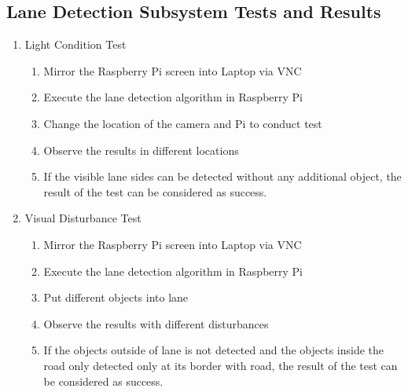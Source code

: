 \documentclass[a4paper,12pt]{article}
\begin{document}
\subsection {Lane Detection Subsystem Tests and Results}	


\begin{enumerate}

\item{Light Condition Test}

\begin{enumerate}

\item Mirror the Raspberry Pi screen into Laptop via VNC  

\item Execute the lane detection algorithm in Raspberry Pi 

\item Change the location of the camera and Pi to conduct test 

\item Observe the results in different locations   

\item If the visible lane sides can be detected without any additional object, the result of the test can be considered as success. 

\end{enumerate}

\item{Visual Disturbance Test}

\begin{enumerate}

\item Mirror the Raspberry Pi screen into Laptop via VNC   

\item Execute the lane detection algorithm in Raspberry Pi  

\item Put different objects into lane  

\item Observe the results with different disturbances 

\item If the objects outside of lane is not detected and the objects inside the road only detected only at its border with road, the result of the test can be considered as success.  

\end{enumerate}

\end{enumerate}
\end{document}
